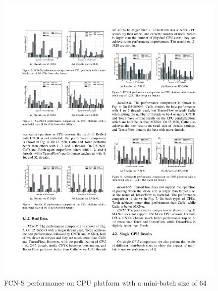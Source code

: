 \documentclass[11pt, oneside]{article}   	%
\begin{document}
\begin{figure}[htbp] 
	\includegraphics[width=\linewidth]{figures/FCN-S1.pdf} 
	\caption{FCN-S performance on CPU platform with a mini-batch size of 64}
\end{figure}
%
\end{document}
